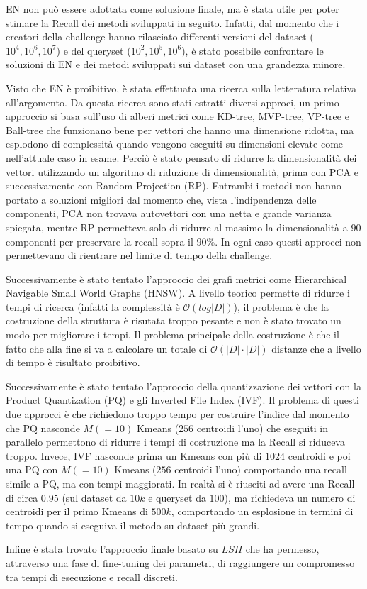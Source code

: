 EN non può essere adottata come soluzione finale, ma è stata utile per poter 
stimare la Recall dei metodi sviluppati in seguito. Infatti, dal momento che i 
creatori della challenge hanno rilasciato differenti versioni del dataset ($10^4, 10^6, 10^7$) e del 
queryset ($10^2, 10^5, 10^6$), è stato possibile confrontare le soluzioni di EN
e dei metodi sviluppati sui dataset con una grandezza minore. 

Visto che EN è proibitivo, è stata effettuata una ricerca sulla letteratura 
relativa all'argomento. Da questa ricerca sono stati estratti diversi approci, 
un primo approccio si basa sull'uso di alberi metrici come KD-tree, MVP-tree, VP-tree e Ball-tree 
che funzionano bene per vettori che hanno una dimensione ridotta, ma esplodono 
di complessità quando vengono eseguiti su dimensioni elevate come nell'attuale 
caso in esame. Perciò è stato pensato di ridurre la dimensionalità dei vettori 
utilizzando un algoritmo di riduzione di dimensionalità, prima con PCA e successivamente 
con Random Projection (RP). Entrambi i metodi non hanno portato a soluzioni migliori 
dal momento che, vista l'indipendenza delle componenti, PCA non trovava autovettori 
con una netta e grande varianza spiegata, mentre RP permetteva solo di ridurre al 
massimo la dimensionalità a $90$ componenti per preservare la recall sopra il $90\%$.
In ogni caso questi approcci non permettevano di rientrare nel limite di tempo 
della challenge.

Successivamente è stato tentato l'approccio dei grafi metrici come Hierarchical 
Navigable Small World Graphs (HNSW). A livello teorico permette di ridurre i tempi
di ricerca (infatti la complessità è $\mathcal{O}(log |D|)$), il problema è 
che la costruzione della struttura è risutata troppo pesante e non è stato trovato 
un modo per migliorare i tempi. Il problema principale della costruzione è che 
il fatto che alla fine si va a calcolare un totale di $\mathcal{O}(|D|\cdot |D|)$
distanze che a livello di tempo è risultato proibitivo.

Successivamente è stato tentato l'approccio della quantizzazione dei vettori con 
la Product Quantization (PQ) e gli Inverted File Index (IVF). Il problema di questi 
due approcci è che richiedono troppo tempo per costruire l'indice dal momento che 
PQ nasconde $M(=10)$ Kmeans ($256$ centroidi l'uno) che eseguiti in parallelo permettono 
di ridurre i tempi di costruzione ma la Recall si riduceva troppo. Invece,
IVF nasconde prima un Kmeans con più di $1024$ centroidi e poi una PQ con $M(=10)$
Kmeans ($256$ centroidi l'uno) comportando una recall simile a PQ, ma con tempi 
maggiorati. In realtà 
si è riusciti ad avere una Recall di circa $0.95$ (sul dataset da $10k$ e queryset 
da $100$), ma richiedeva un numero di centroidi per il primo Kmeans di $500k$,
comportando un esplosione in termini di tempo quando si eseguiva il metodo su 
dataset più grandi.

Infine è stata trovato l'approccio finale basato su $LSH$ che ha permesso, attraverso 
una fase di fine-tuning dei parametri, di raggiungere un compromesso tra tempi di 
esecuzione e recall discreti.








